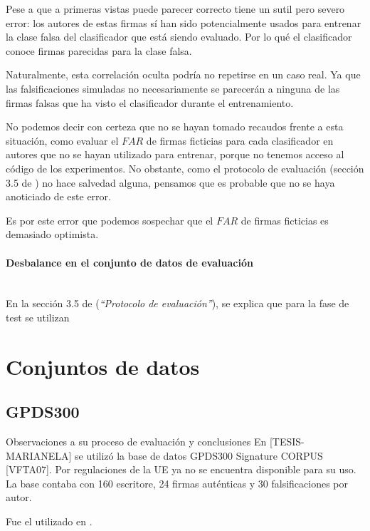 Pese a que a primeras vistas puede parecer correcto tiene un sutil pero severo error: los autores de estas firmas sí han sido potencialmente usados para entrenar la clase falsa del clasificador que está siendo evaluado. Por lo qué el clasificador conoce firmas parecidas para la clase falsa. 

Naturalmente, esta correlación oculta podría no repetirse en un caso real. Ya que las falsificaciones simuladas no necesariamente se parecerán a ninguna de las firmas falsas que ha visto el clasificador durante el entrenamiento.

No podemos decir con certeza que no se hayan tomado recaudos frente a esta situación, como evaluar el $FAR$ de firmas ficticias para cada clasificador en autores que no se hayan utilizado para entrenar, porque no tenemos acceso al código de los experimentos. No obstante, como el protocolo de evaluación (sección 3.5 de \cite{tesis-parodi}) no hace salvedad alguna, pensamos que es probable que no se haya anoticiado de este error.

Es por este error que podemos sospechar que el $FAR$ de firmas ficticias es demasiado optimista.

\paragraph{Desbalance en el conjunto de datos de evaluación}\mbox{}\\

En la sección 3.5 de \cite{tesis-parodi} (\textit{``Protocolo de evaluación''}), se explica que para la fase de test se utilizan

\section{Conjuntos de datos}

\subsection{GPDS300}

Observaciones a su proceso de evaluación y conclusiones
En [TESIS-MARIANELA] se utilizó la base de datos GPDS300 Signature CORPUS [VFTA07]. Por regulaciones de la UE ya no se encuentra disponible para su uso. La base contaba con 160 escritore, 24 firmas auténticas y 30 falsificaciones por autor.


Fue el utilizado en \cite{tesis-parodi}. %

